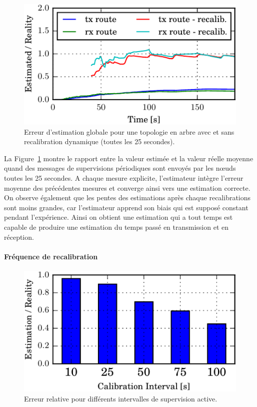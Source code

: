 \begin{figure}[ht]
  \centering
  \includegraphics{img/ratio_recalibration_global-crop.pdf}
  \caption{Erreur d'estimation globale pour une topologie en arbre avec et sans recalibration dynamique (toutes les 25 secondes).}
  \label{supervision:fig:tree_calibration}
\end{figure}

La Figure~\ref{supervision:fig:tree_calibration} montre le rapport entre la valeur estimée et la valeur réelle moyenne quand des messages de supervisions périodiques sont envoyés par les nœuds toutes les 25 secondes.
A chaque mesure explicite, l'estimateur intègre l'erreur moyenne des précédentes mesures et converge ainsi vers une estimation correcte.
On observe également que les pentes des estimations après chaque recalibrations sont moins grandes, car l'estimateur apprend son biais qui est supposé constant pendant l'expérience.
Ainsi on obtient une estimation qui a tout temps est capable de produire une estimation du temps passé en transmission et en réception.

\paragraph{Fréquence de recalibration}

\begin{figure}[ht]
  \centering
  \includegraphics{img/ratio_recalibration-crop.pdf}
  \caption{Erreur relative pour différents intervalles de supervision active.}
  \label{supervision:fig:frequencies_error}
\end{figure}

